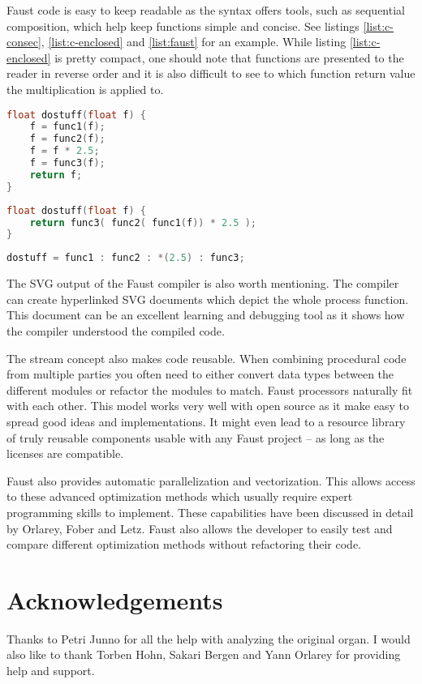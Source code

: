 \documentclass[11pt,a4paper]{article}
\begin{document}
Faust code is easy to keep readable as the syntax offers tools, such as sequential composition, which help keep functions simple and concise. See listings \ref{list:c-consec}, \ref{list:c-enclosed} and \ref{list:faust} for an example. While listing \ref{list:c-enclosed} is pretty compact, one should note that functions are presented to the reader in reverse order and it is also difficult to see to which function return value the multiplication is applied to.

\begin{lstlisting}[language=C,label=list:c-consec,caption=Consecutive calls]
float dostuff(float f) {
	f = func1(f);
	f = func2(f);
	f = f * 2.5;
	f = func3(f);
	return f;
}
\end{lstlisting}

\begin{lstlisting}[language=C,label=list:c-enclosed,caption=Enclosed statements]
float dostuff(float f) {
	return func3( func2( func1(f)) * 2.5 );
}
\end{lstlisting}

\begin{lstlisting}[language=C,label=list:faust,caption=Faust sequential composition]
dostuff = func1 : func2 : *(2.5) : func3;
\end{lstlisting}

The SVG output of the Faust compiler is also worth mentioning. The compiler can create hyperlinked SVG documents which depict the whole process function. This document can be an excellent learning and debugging tool as it shows how the compiler understood the compiled code.

The stream concept also makes code reusable. When combining procedural code from multiple parties you often need to either convert data types between the different modules or refactor the modules to match. Faust processors naturally fit with each other. This model works very well with open source as it make easy to spread good ideas and implementations. It might even lead to a resource library of truly reusable components usable with any Faust project -- as long as the licenses are compatible.

Faust also provides automatic parallelization and vectorization. This allows access to these advanced optimization methods which usually require expert programming skills to implement. These capabilities have been discussed in detail by Orlarey, Fober and Letz\cite{orlarey:09a}. Faust also allows the developer to easily test and compare different optimization methods without refactoring their code.
\section{Acknowledgements}

Thanks to Petri Junno for all the help with analyzing the original organ. I would also like to thank Torben Hohn, Sakari Bergen and Yann Orlarey for providing help and support. %




\end{document}
